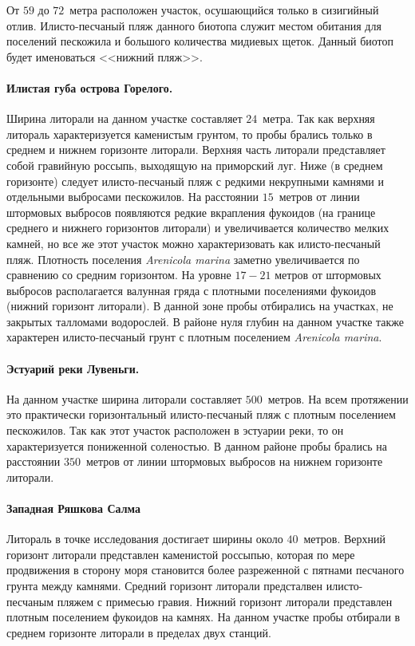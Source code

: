 От $59$ до $72$~метра расположен участок, осушающийся только в сизигийный отлив. 
Илисто-песчаный пляж данного биотопа служит местом обитания для поселений пескожила и большого количества мидиевых щеток. 
Данный биотоп будет именоваться <<нижний пляж>>. 


\paragraph{Илистая губа острова Горелого.}
Ширина литорали на данном участке составляет $24$~метра. 
Так как верхняя литораль характеризуется каменистым грунтом, то пробы брались только в среднем и нижнем горизонте литорали.
Верхняя часть литорали представляет собой гравийную россыпь, выходящую на приморский луг. 
Ниже (в среднем горизонте) следует илисто-песчаный пляж с редкими некрупными камнями и отдельными выбросами пескожилов.  
На расстоянии $15$~метров от линии штормовых выбросов появляются редкие вкрапления фукоидов (на границе среднего и нижнего горизонтов литорали) и увеличивается количество мелких камней, но  все же этот участок можно характеризовать как илисто-песчаный пляж. 
Плотность поселения {\it Arenicola marina} заметно увеличивается по сравнению со средним горизонтом.
На уровне $17-21$ метров от штормовых выбросов располагается валунная гряда с плотными поселениями фукоидов (нижний горизонт литорали). 
В данной зоне пробы отбирались на участках, не закрытых талломами водорослей. 
В районе нуля глубин на данном участке также характерен илисто-песчаный грунт с плотным поселением {\it Arenicola marina}.


\paragraph{Эстуарий реки Лувеньги.}
На данном участке ширина литорали составляет $500$~метров. 
На всем протяжении это практически горизонтальный илисто-песчаный пляж с плотным поселением пескожилов. 
Так как этот участок расположен в эстуарии реки, то он характеризуется пониженной соленостью. 
В данном районе пробы брались на расстоянии $350$~метров от линии штормовых выбросов на нижнем горизонте литорали.

\paragraph{Западная Ряшкова Салма}
Литораль в точке исследования достигает ширины около $40$~метров.
Верхний горизонт литорали представлен каменистой россыпью, которая по мере продвижения в сторону моря становится более разреженной с пятнами песчаного грунта между камнями.
Средний горизонт литорали предсталвен илисто-песчаным пляжем с примесью гравия.
Нижний горизонт литорали представлен плотным поселением фукоидов на камнях.
На данном участке пробы отбирали в среднем горизонте литорали в пределах двух станций.


